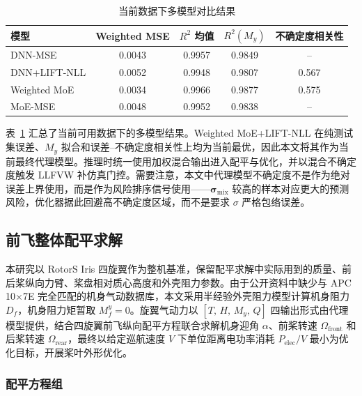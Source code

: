 \begin{table}[H]
  \centering
  \caption{当前数据下多模型对比结果}
  \label{tab:partial_sweep_best}
  \small
  \renewcommand{\arraystretch}{1.12}
  \begin{tabularx}{\textwidth}{p{3.9cm} c c c c}
    \toprule
    模型 & Weighted MSE & $R^2$ 均值 & $R^2(M_y)$ & 不确定度相关性 \\
    \midrule
    DNN-MSE & 0.0043 & 0.9957 & 0.9849 & -- \\
    DNN+LIFT-NLL & 0.0052 & 0.9948 & 0.9807 & 0.567 \\
    Weighted MoE & 0.0034 & 0.9966 & 0.9877 & 0.575 \\
    MoE-MSE & 0.0048 & 0.9952 & 0.9838 & -- \\
    \bottomrule
  \end{tabularx}
\end{table}

表~\ref{tab:partial_sweep_best} 汇总了当前可用数据下的多模型结果。Weighted MoE+LIFT-NLL 在纯测试集误差、$M_y$ 拟合和误差--不确定度相关性上均为当前最优，因此本文将其作为当前最终代理模型。推理时统一使用加权混合输出进入配平与优化，并以混合不确定度触发 LLFVW 补仿真门控。需要注意，本文中代理模型不确定度不是作为绝对误差上界使用，而是作为风险排序信号使用——$\bm{\sigma}_{\mathrm{mix}}$ 较高的样本对应更大的预测风险，优化器据此回避高不确定度区域，而不是要求 $\sigma$ 严格包络误差。

\subsection{前飞整体配平求解}

本研究以 RotorS Iris 四旋翼作为整机基准，保留配平求解中实际用到的质量、前后桨纵向力臂、桨盘相对质心高度和外壳阻力参数。由于公开资料中缺少与 APC 10$\times$7E 完全匹配的机身气动数据库，本文采用半经验外壳阻力模型计算机身阻力 $D_f$，机身阻力矩暂取 $M_f^y=0$。旋翼气动力以 $[T,\,H,\,M_y,\,Q]$ 四输出形式由代理模型提供，结合四旋翼前飞纵向配平方程联合求解机身迎角 $\alpha$、前桨转速 $\Omega_\text{front}$ 和后桨转速 $\Omega_\text{rear}$，最终以给定巡航速度 $V$ 下单位距离电功率消耗 $P_\text{elec}/V$ 最小为优化目标，开展桨叶外形优化。

\subsubsection{配平方程组}


